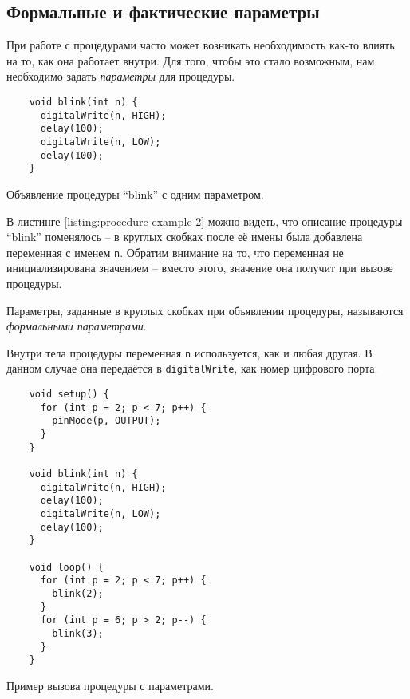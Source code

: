 \documentclass[../sparc.tex]{subfiles}
\begin{document}
\subsection{Формальные и фактические параметры}

При работе с процедурами часто может возникать необходимость как-то влиять на
то, как она работает внутри.  Для того, чтобы это стало возможным, нам
необходимо задать \emph{параметры} для процедуры.

\begin{listing}[H]
  \begin{verbatim}
    void blink(int n) {
      digitalWrite(n, HIGH);
      delay(100);
      digitalWrite(n, LOW);
      delay(100);
    }
  \end{verbatim}
  \label{listing:procedure-example-2}
  \caption{Объявление процедуры ``blink'' с одним параметром.}
\end{listing}

В листинге \ref{listing:procedure-example-2} можно видеть, что описание
процедуры ``blink'' поменялось -- в круглых скобках после её имены была добавлена
переменная с именем \texttt{n}.  Обратим внимание на то, что переменная
не инициализирована значением -- вместо этого, значение она получит при вызове
процедуры.

Параметры, заданные в круглых скобках при объявлении процедуры, называются
\emph{формальными параметрами}.

Внутри тела процедуры переменная \texttt{n} используется, как и любая
другая.  В данном случае она передаётся в \texttt{digitalWrite}, как
номер цифрового порта.

\begin{listing}[H]
  \begin{verbatim}
    void setup() {
      for (int p = 2; p < 7; p++) {
        pinMode(p, OUTPUT);
      }
    }

    void blink(int n) {
      digitalWrite(n, HIGH);
      delay(100);
      digitalWrite(n, LOW);
      delay(100);
    }

    void loop() {
      for (int p = 2; p < 7; p++) {
        blink(2);
      }
      for (int p = 6; p > 2; p--) {
        blink(3);
      }
    }
  \end{verbatim}
  \label{listing:procedure-example-3}
  \caption{Пример вызова процедуры с параметрами.}
\end{listing}
\end{document}
